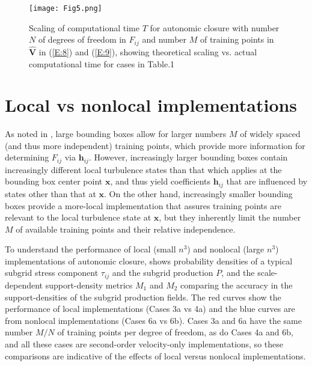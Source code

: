 %
\begin{figure}
	\begin{center}
	\texttt{[image: Fig5.png]}
	\caption{ Scaling of computational time $T$ for autonomic closure with number $N$ of degrees of freedom in $F_{ij}$ and number $M$ of training points in $\widehat{\mathbf{V}}$ in (\ref{E:8}) and (\ref{E:9}), showing theoretical scaling vs. actual computational time for cases in Table.1}
	\label{F:5}
	\end{center}
\end{figure}
%
%

\section{Local vs nonlocal implementations} 
\label{sec:IVB}

As noted in , large bounding boxes allow for larger numbers $M$ of widely spaced (and thus more independent) training points, which provide more information for determining $F_{ij}$  via $\mathbf{h}_{ij}$. However, increasingly larger bounding boxes contain increasingly different local turbulence states than that which applies at the bounding box center point $\mathbf{x}$, and thus yield coefficients $\mathbf{h}_{ij}$  that are influenced by states other than that at $\mathbf{x}$. On the other hand, increasingly smaller bounding boxes provide a more-local implementation that assures training points are relevant to the local turbulence state at $\mathbf{x}$, but they inherently limit the number $M$ of available training points and their relative independence.  

To understand the performance of local (small $n^3$) and nonlocal (large $n^3$) implementations of autonomic closure,  shows probability densities of a typical subgrid stress component  $\tau_{ij}$ and the subgrid production $P$, and the scale-dependent support-density metrics $M_1$ and $M_2$  comparing the accuracy in the support-densities of the subgrid production fields. The red curves show the performance of local implementations (Cases 3a vs 4a) and the blue curves are from nonlocal implementations (Cases 6a vs 6b). Cases 3a and 6a have the same number $M/N$  of training points per degree of freedom, as do Cases 4a and 6b, and all these cases are second-order velocity-only implementations, so these comparisons are indicative of the effects of local versus nonlocal implementations. 


